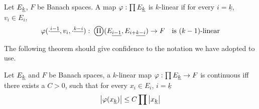 \documentclass[../main-manifolds.tex]{subfiles}
\begin{document}
\begin{definition}\label{def:k-linear-maps}
    Let $\UL{E}[k]$, $F$ be Banach spaces. A map $\varphi: \prod \UL{E}[k]$ is $k$-linear if for every $i=\underline{k}$, $v_i\in E_i$, 
    \[
        \varphi(\UPL{\cdot}[i-1],v_i,\UPL{\cdot}[k-i]):\: \bigoprod (\UL{E}[i-1],\UL{E}[i+][k-i])\to F\quad\text{is }(k-1)\text{-linear}
    \]
\end{definition}
The following theorem should give confidence to the notation we have adopted to use.
\begin{wts}
    Let $\UL{E}[k]$ and $F$ be Banach spaces, a $k$-linear map $\varphi: \prod \UL{E}[k]\to F$ is continuous iff there exists a $C>0$, such that for every $x_i\in E_i$, $i=\underline{k}$
    \[
        \abs{\varphi(\UL{x}[k])} \leq C\prod \abs{\UL{x}[k]}
    \]
\end{wts}
\end{document}
